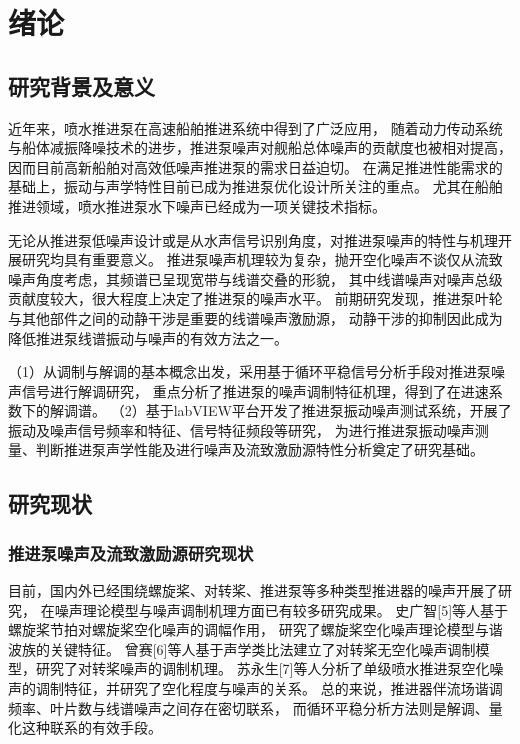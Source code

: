 \chapter{绪论}

\section{研究背景及意义}

近年来，喷水推进泵在高速船舶推进系统中得到了广泛应用，
随着动力传动系统与船体减振降噪技术的进步，推进泵噪声对舰船总体噪声的贡献度也被相对提高，
因而目前高新船舶对高效低噪声推进泵的需求日益迫切。
在满足推进性能需求的基础上，振动与声学特性目前已成为推进泵优化设计所关注的重点。
尤其在船舶推进领域，喷水推进泵水下噪声已经成为一项关键技术指标。

无论从推进泵低噪声设计或是从水声信号识别角度，对推进泵噪声的特性与机理开展研究均具有重要意义。
推进泵噪声机理较为复杂，抛开空化噪声不谈仅从流致噪声角度考虑，其频谱已呈现宽带与线谱交叠的形貌，
其中线谱噪声对噪声总级贡献度较大，很大程度上决定了推进泵的噪声水平。
前期研究发现，推进泵叶轮与其他部件之间的动静干涉是重要的线谱噪声激励源，
动静干涉的抑制因此成为降低推进泵线谱振动与噪声的有效方法之一。

（1）从调制与解调的基本概念出发，采用基于循环平稳信号分析手段对推进泵噪声信号进行解调研究，
重点分析了推进泵的噪声调制特征机理，得到了在进速系数下的解调谱。
（2）基于labVIEW平台开发了推进泵振动噪声测试系统，开展了振动及噪声信号频率和特征、信号特征频段等研究，
为进行推进泵振动噪声测量、判断推进泵声学性能及进行噪声及流致激励源特性分析奠定了研究基础。 


\section{研究现状}
\subsection{推进泵噪声及流致激励源研究现状}
目前，国内外已经围绕螺旋桨、对转桨、推进泵等多种类型推进器的噪声开展了研究，
在噪声理论模型与噪声调制机理方面已有较多研究成果。
史广智[5]等人基于螺旋桨节拍对螺旋桨空化噪声的调幅作用，
研究了螺旋桨空化噪声理论模型与谐波族的关键特征。
曾赛[6]等人基于声学类比法建立了对转桨无空化噪声调制模型，研究了对转桨噪声的调制机理。
苏永生[7]等人分析了单级喷水推进泵空化噪声的调制特征，并研究了空化程度与噪声的关系。
总的来说，推进器伴流场谐调频率、叶片数与线谱噪声之间存在密切联系，
而循环平稳分析方法则是解调、量化这种联系的有效手段。


